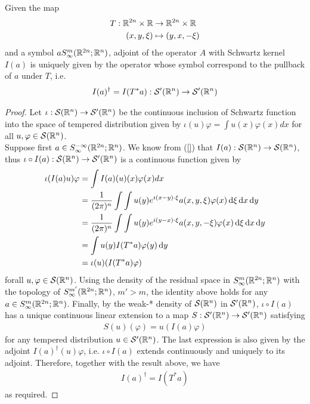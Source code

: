 \documentclass[12pt]{article}
\begin{document}
\begin{flemma} 
    Given the map
    \begin{align*}
    T: \R^{2n} \times \R &\to \R^{2n} \times \R \\
    (x, y, \xi) &\mapsto (y, x, -\xi)
    \end{align*}
    and a symbol $a S^{m}_{\infty}(\R^{2n}; \R^{n})$, adjoint of the operator $A$ with Schwartz kernel $I(a)$ is uniquely given by the operator whose symbol correspond to the pullback of $a$ under $T$, i.e. 
    \begin{align*}
    I(a)^\dagger = I(T^*a) : \sch'(\R^n) \to \sch'(\R^n)
    \end{align*}    
\end{flemma}
\begin{proof}
    Let $\iota : \sch(\R^n) \to \sch'(\R^n)$ be the continuous inclusion of Schwartz function into the space of tempered distribution given by $\iota(u) \varphi = \int u(x) \varphi(x) dx$ for all $u, \varphi \in \sch(\R^n)$. \\
    
    Suppose first $a \in S^{-\infty}_{\infty}(\R^{2n}; \R^{n})$. We know from (\ref{}) that $I(a) : \sch(\R^n) \to \sch(\R^n)$, thus $\iota \circ I(a) : \sch(\R^n) \to \sch'(\R^n)$ is a continuous function given by \begin{align*}
    \iota(I(a)u) \varphi
    & = \int I(a)(u)(x) \varphi(x) dx \\
    & = \frac{1}{(2\pi)^n}  \int\int u(y) e^{i (x - y) \cdot \xi} a(x, y, \xi) \varphi(x) \d[\xi] \d[x] \d[y] \\
    & =  \frac{1}{(2\pi)^n} \int \int u(y) e^{i (y - x) \cdot \xi} a(x, y, - \xi) \varphi(x) \d[\xi] \d[x] \d[y] \\
    &= \int u(y) I(T^*a) \varphi(y) \d[y]\\
    & = \iota(u)(I(T^*a)\varphi)
    \end{align*}
    forall $u, \varphi \in \sch(\R^n)$. Using the density of the residual space in $S^{m}_{\infty}(\R^{2n}; \R^{n})$ with the topology of $S^{m'}_{\infty}(\R^{2n}; \R^{n})$, $m' > m$, the identity above holds for any $a \in S^{m}_{\infty}(\R^{2n}; \R^{n})$. Finally, by the weak-* density of $\sch(\R^n)$ in $\sch'(\R^n)$, $\iota \circ I(a)$ has a unique continuous linear extension to a map $S: \sch'(\R^n) \to \sch'(\R^n)$ satisfying
    \begin{align*}
    S(u)(\varphi) = u(I(a)\varphi) 
    \end{align*}
    for any tempered distribution $u \in \sch'(\R^n)$. The last expression is also given by the adjoint $I(a)^\dagger (u) \varphi$, i.e. $\iota \circ I(a)$ extends continuously and uniquely to its adjoint. Therefore, together with the result above, we have 
    \begin{align*}
    I(a)^\dagger = I(T^* a)
    \end{align*}
    as required. 
\end{proof}
\end{document}
